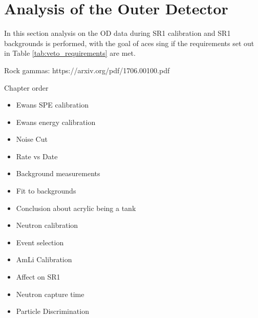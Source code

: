 \chapter{Analysis of the Outer Detector} \label{chap:analysis_of_the_od}

In this section analysis on the OD data during SR1 calibration and SR1 backgrounds is performed, with the goal of aces sing if the requirements set out in Table \ref{tab:veto_requirements} are met.

Rock gammas: https://arxiv.org/pdf/1706.00100.pdf

Chapter order
\begin{itemize}
    \item Ewans SPE calibration
    \item Ewans energy calibration
    \item Noise Cut
    \item Rate vs Date
    \item Background measurements
    \item Fit to backgrounds
    \item Conclusion about acrylic being a tank
    \item Neutron calibration
    \item Event selection
    \item AmLi Calibration
    \item Affect on SR1
    \item Neutron capture time
    \item Particle Discrimination
\end{itemize}

%

%

%

%






